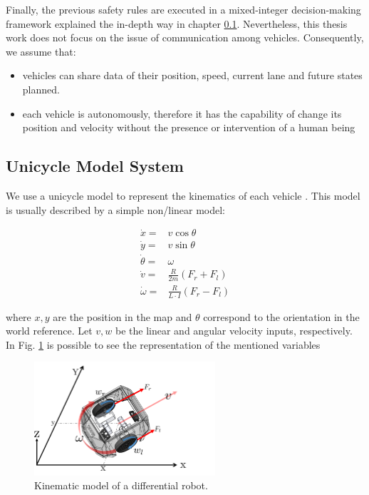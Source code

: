 Finally,  the previous safety rules are executed in a mixed-integer decision-making framework explained the in-depth way in chapter \ref{Unicicle_model}. Nevertheless, this thesis work does not focus on the issue of communication among vehicles. Consequently, we assume that:
\begin{itemize}
    \item vehicles can share data of their position, speed, current lane and future states planned. 
\item each vehicle is autonomously, therefore it has the capability of change its position and velocity without the presence or intervention of a human being
\end{itemize}







\subsection{Unicycle Model System}
\label{Unicicle_model}
We use a unicycle model to represent the kinematics of each vehicle \cite{kinematic}. This model is usually described by a simple non/linear model: 


\begin{align}
  \dot{x} =& v \cos{\theta}\\ 
  \dot{y} =& v \sin{\theta} \\
\dot{\theta} =& \omega  \\ 
\dot{v} =& \frac{R}{2m} (F_{r} + F_{l}) \\ 
\dot{\omega} =& \frac{R}{L \cdot I} (F_{r} - F_{l})  
\end{align}

where $x,y$ are the position in the map and $\theta$ correspond to the orientation in the world reference. Let $v, w$ be the linear and angular velocity inputs, respectively. In Fig. \ref{kinematic2} is possible to see the representation of the mentioned variables


\begin{figure}[h!]
\centering
    \includegraphics[width=0.6\textwidth]{Kap3/kinematic.png}
    \caption{Kinematic model of a differential robot.}
    \label{kinematic2}

\end{figure}


